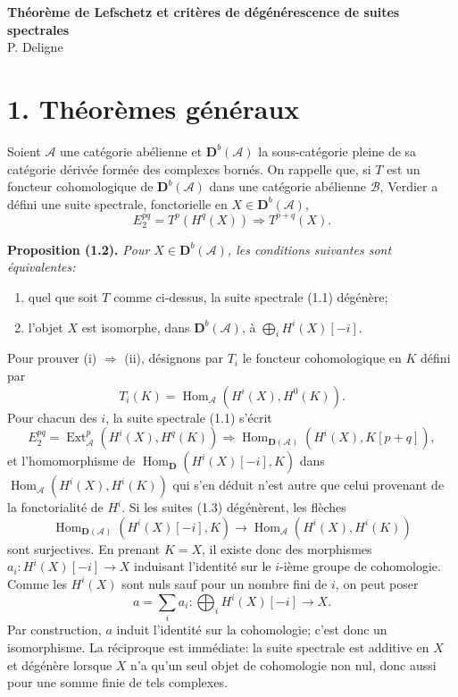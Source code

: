 \documentclass[11pt]{article}
\DeclareMathOperator{\Hom}{Hom}
\DeclareMathOperator{\Ext}{Ext}
\newcommand{\bD}{\mathbf D}
\newcommand{\cA}{\mathcal A}
\newcommand{\cB}{\mathcal B}
\newenvironment{named}[1]{\par\medskip\noindent\textbf{#1}\itshape}{\par\medskip}
\begin{document}
\begin{center}
{\Large\bfseries Théorème de Lefschetz et critères de dégénérescence de suites spectrales}\\[0.7em]
{\large P. Deligne}
\end{center}

\section*{1. Théorèmes généraux}
Soient $\cA$ une catégorie abélienne et $\bD^b(\cA)$ la sous-catégorie pleine de sa catégorie dérivée formée des complexes bornés. On rappelle que, si $T$ est un foncteur cohomologique de $\bD^b(\cA)$ dans une catégorie abélienne $\cB$, Verdier a défini une suite spectrale, fonctorielle en $X\in\bD^b(\cA)$,
\begin{equation}\tag{1.1}
E_2^{pq}=T^p(H^q(X))\Longrightarrow T^{p+q}(X).
\end{equation}

\begin{named}{Proposition (1.2).}
Pour $X\in\bD^b(\cA)$, les conditions suivantes sont équivalentes:
\begin{enumerate}[label=(\roman*)]
\item quel que soit $T$ comme ci-dessus, la suite spectrale (1.1) dégénère;
\item l'objet $X$ est isomorphe, dans $\bD^b(\cA)$, à $\bigoplus_i H^i(X)[-i]$.
\end{enumerate}
\end{named}
Pour prouver (i) $\Rightarrow$ (ii), désignons par $T_i$ le foncteur cohomologique en $K$ défini par
\[
T_i(K)=\Hom_\cA(H^i(X),H^0(K)).
\]
Pour chacun des $i$, la suite spectrale (1.1) s'écrit
\begin{equation}\tag{1.3}
E_2^{pq}=\Ext_\cA^p(H^i(X),H^q(K))\Longrightarrow \Hom_{\bD(\cA)}(H^i(X),K[p+q]),
\end{equation}
et l'homomorphisme de $\Hom_{\bD}(H^i(X)[-i],K)$ dans $\Hom_\cA(H^i(X),H^i(K))$ qui s'en déduit n'est autre que celui provenant de la fonctorialité de $H^i$. Si les suites (1.3) dégénèrent, les flèches
\[
\Hom_{\bD(\cA)}(H^i(X)[-i],K)\longrightarrow \Hom_\cA(H^i(X),H^i(K))
\]
sont surjectives. En prenant $K=X$, il existe donc des morphismes $a_i:H^i(X)[-i]\to X$ induisant l'identité sur le $i$-ième groupe de cohomologie. Comme les $H^i(X)$ sont nuls sauf pour un nombre fini de $i$, on peut poser
\[
a=\sum_i a_i:\bigoplus_i H^i(X)[-i]\longrightarrow X.
\]
Par construction, $a$ induit l'identité sur la cohomologie; c'est donc un isomorphisme. La réciproque est immédiate: la suite spectrale est additive en $X$ et dégénère lorsque $X$ n'a qu'un seul objet de cohomologie non nul, donc aussi pour une somme finie de tels complexes.
\end{document}
